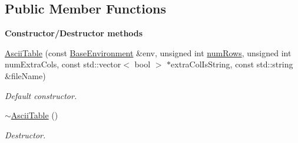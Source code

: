 \subsection*{Public Member Functions}
\begin{Indent}{\bf Constructor/\-Destructor methods}\par
\begin{DoxyCompactItemize}
\item 
\hyperlink{class_q_u_e_s_o_1_1_ascii_table_a4d856e0d046d823e906aa4448b5762f1}{Ascii\-Table} (const \hyperlink{class_q_u_e_s_o_1_1_base_environment}{Base\-Environment} \&env, unsigned int \hyperlink{class_q_u_e_s_o_1_1_ascii_table_aa764ef68ef1d2ed85a4b6bd4eb0d7b17}{num\-Rows}, unsigned int num\-Extra\-Cols, const std\-::vector$<$ bool $>$ $\ast$extra\-Col\-Is\-String, const std\-::string \&file\-Name)
\begin{DoxyCompactList}\small\item\em Default constructor. \end{DoxyCompactList}\item 
\hyperlink{class_q_u_e_s_o_1_1_ascii_table_a2ff35b2d6920dc9e13dd8966a76beb10}{$\sim$\-Ascii\-Table} ()
\begin{DoxyCompactList}\small\item\em Destructor. \end{DoxyCompactList}\end{DoxyCompactItemize}
\end{Indent}
